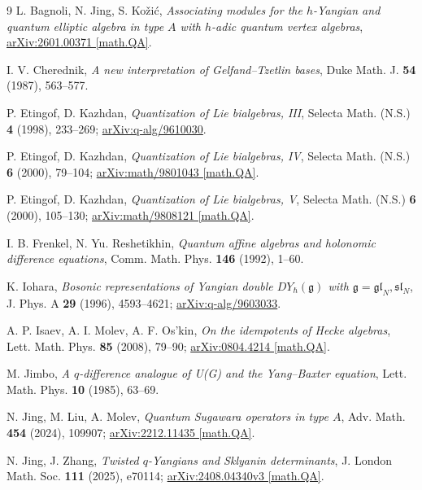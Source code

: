 \documentclass[12pt,a4paper,reqno]{amsart}
\theoremstyle{stil}
\theoremstyle{defi}
\theoremstyle{defi}
\theoremstyle{stil}
\theoremstyle{stil}
\theoremstyle{stil}
\theoremstyle{prim}
\begin{document}
 
\begin{thebibliography}{9}
L. Bagnoli, N. Jing, S. Ko\v{z}i\'{c}, 
{\em Associating modules for the $h$-Yangian and quantum elliptic algebra in type $A$ with $h$-adic quantum vertex algebras}, 
\href{https://arxiv.org/abs/2601.00371}{arXiv:2601.00371 [math.QA]}.

I. V. Cherednik, 
{\em A  new  interpretation  of  Gelfand--Tzetlin bases},
Duke Math. J. \textbf{54} (1987), 563--577.

P. Etingof,  D. Kazhdan, 
{\em Quantization of Lie bialgebras, III},
 Selecta Math. (N.S.) \textbf{4} (1998), 233--269;
\href{https://arxiv.org/abs/q-alg/9610030v2}{arXiv:q-alg/9610030}.

P. Etingof, D. Kazhdan,
{\em Quantization of Lie bialgebras, IV},
Selecta Math. (N.S.) {\bf 6} (2000), 79--104;
\href{https://arxiv.org/abs/math/9801043}{arXiv:math/9801043 [math.QA]}.

P. Etingof, D. Kazhdan,
{\em Quantization of Lie bialgebras, V}, 
Selecta Math. (N.S.) \textbf{6} (2000), 105--130;
\href{http://arxiv.org/abs/math/9808121}{arXiv:math/9808121 [math.QA]}.

I. B. Frenkel, N. Yu. Reshetikhin,
{\em Quantum affine algebras and holonomic difference equations},
Comm. Math. Phys. {\bf 146} (1992), 1--60.

K. Iohara,
{\em Bosonic representations of Yangian double $DY_{\hbar}(\mathfrak{g})$ with $\mathfrak{g}=\mathfrak{gl}_N,\mathfrak{sl}_N$},
J. Phys. A \textbf{29} (1996), 4593--4621;
\href{https://arxiv.org/abs/q-alg/9603033}{arXiv:q-alg/9603033}.

A. P. Isaev, A. I. Molev, A. F. Os'kin,
{\em On the idempotents of Hecke algebras},
Lett. Math. Phys. \textbf{85} (2008), 79--90;
\href{https://arxiv.org/abs/0804.4214v1}{arXiv:0804.4214 [math.QA]}.

M. Jimbo,
{\em A $q$-difference analogue of U(G) and the Yang--Baxter equation},
 Lett. Math. Phys. \textbf{10} (1985), 63--69.

N. Jing, M. Liu, A. Molev,
{\em Quantum Sugawara operators in type $A$},
Adv. Math. \textbf{454} (2024), 109907;
\href{https://arxiv.org/abs/2212.11435v1}{arXiv:2212.11435 [math.QA]}.

N. Jing, J. Zhang,
{\em Twisted $q$-Yangians and Sklyanin determinants},
J. London Math. Soc. \textbf{111} (2025), e70114;
\href{https://arxiv.org/abs/2408.04340v3}{arXiv:2408.04340v3 [math.QA]}.


\end{thebibliography}
\end{document}
